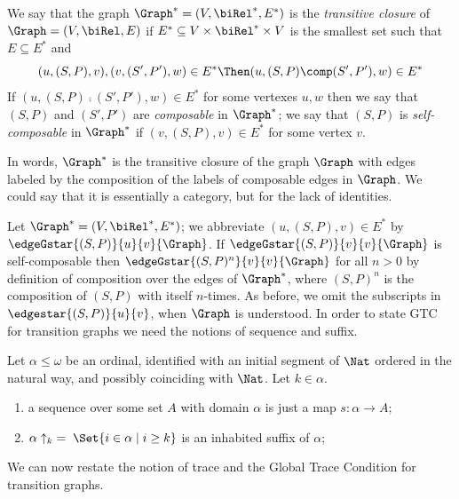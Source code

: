 \begin{definition}\label{def:transitiveClosure}
We say that  the graph $\Graph^* = (V, \biRel^*, E^*)$ is the {\em transitive closure} of $\Graph = (V, \biRel, E)$ if
$E^* \subseteq V \times \biRel^* \times V$ is the smallest set such that $E \subseteq E^*$ and
\[ (u, (S,P), v), (v, (S',P'), w) \in E^* \Then (u, (S,P) \comp (S',P'), w) \in E^*\]
If $(u, (S,P) \comp (S',P'), w) \in E^*$ for some vertexes $u, w$ then we say that $(S,P)$ and $(S',P')$ are {\em composable} in $\Graph^*$; we say
that $(S,P)$ is {\em self-composable} in $\Graph^*$ if $(v, (S,P), v) \in E^*$ for some vertex $v$.
\end{definition}

In words, $\Graph^*$ is the transitive closure of the graph $\Graph$ with edges labeled by the composition of the labels of composable edges in $\Graph$. 
We could say that it is essentially a category, but for the lack of identities.

Let $\Graph^* = (V, \biRel^*, E^*)$; we abbreviate $(u, (S,P), v) \in E^*$ by %
$\edgeGstar{(S,P)}{u}{v}{\Graph}$. 
If $\edgeGstar{(S,P)}{v}{v}{\Graph}$ is self-composable then $\edgeGstar{(S,P)^n}{v}{v}{\Graph}$ for all $n > 0$ by definition of composition over the edges 
of $\Graph^*$, where $(S,P)^n$ is the composition of $(S,P)$ with itself $n$-times.
As before, we omit the subscripts in $\edgestar{(S,P)}{u}{v}$, when $\Graph$ is understood.
In order to state GTC for transition graphs we need the notions of sequence and suffix.

\begin{definition}
Let $\alpha \leq \omega$ be an ordinal, 
identified with an initial segment of $\Nat$ 
ordered in the natural way, and possibly coinciding with $\Nat$. Let $k \in \alpha$.
\begin{enumerate}
\item
a sequence over some set $A$ with domain $\alpha$ is just a map $s:\alpha \to A$;  

\item
$\alpha\uparrow_k \;=\; \Set{i \in \alpha \mid i \geq k}$ is an inhabited suffix of $\alpha$; 


\end{enumerate}
\end{definition}

We can now restate the notion of trace and the Global Trace Condition for transition graphs.

